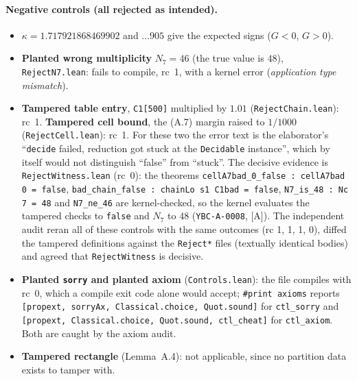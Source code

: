 \documentclass[11pt]{article}
\newcommand{\tier}[1]{\textsf{[#1]}}
\newcommand{\tA}{\tier{A}}
\newcommand{\lean}[1]{\texttt{#1}}
\begin{document}
\paragraph{Negative controls (all rejected as intended).}
\begin{itemize}\itemsep=0pt
\item $\kappa=1.717921868469902$ and $\ldots905$ give the expected signs ($G<0$, $G>0$).
\item \textbf{Planted wrong multiplicity} $N_7=46$ (the true value is $48$), \texttt{RejectN7.lean}: fails to compile, rc~1, with a kernel error (\emph{application type mismatch}).
\item \textbf{Tampered table entry}, \lean{C1[500]} multiplied by $1.01$ (\texttt{RejectChain.lean}): rc~1. \textbf{Tampered cell bound}, the (A.7) margin raised to $1/1000$ (\texttt{RejectCell.lean}): rc~1.
For these two the error text is the elaborator's ``\lean{decide} failed, reduction got stuck at the \lean{Decidable} instance'', which by itself would not distinguish ``false'' from ``stuck''. The decisive evidence is
\texttt{RejectWitness.lean} (rc~0): the theorems \lean{cellA7bad\_0\_false : cellA7bad 0 = false}, \lean{bad\_chain\_false : chainLo s1 C1bad = false}, \lean{N7\_is\_48 : Nc 7 = 48} and \lean{N7\_ne\_46} are kernel-checked, so the kernel evaluates the tampered checks to \lean{false} and $N_7$ to $48$ (\texttt{YBC-A-0008}, \tA{}). The independent audit reran all of these controls with the same outcomes (rc 1, 1, 1, 0), diffed the tampered definitions against the \texttt{Reject*} files (textually identical bodies) and agreed that \texttt{RejectWitness} is decisive.
\item \textbf{Planted \lean{sorry} and planted axiom} (\texttt{Controls.lean}): the file compiles with rc~0, which a compile exit code alone would accept; \lean{\#print axioms} reports
\lean{[propext, sorryAx, Classical.choice, Quot.sound]} for \lean{ctl\_sorry} and \lean{[propext, Classical.choice, Quot.sound, ctl\_cheat]} for \lean{ctl\_axiom}. Both are caught by the axiom audit.
\item \textbf{Tampered rectangle} (Lemma~A.4): not applicable, since no partition data exists to tamper with.
\end{itemize}

\end{document}
